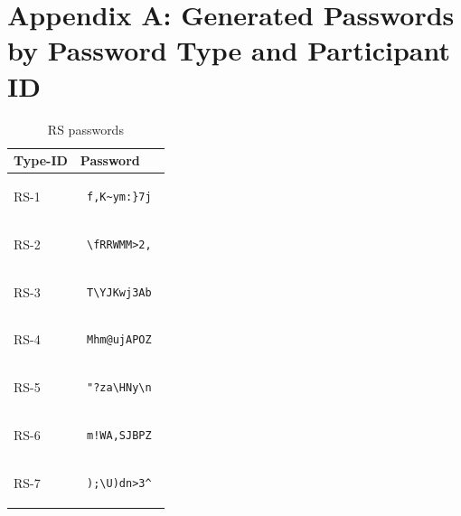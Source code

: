 \documentclass{article}
\begin{document}
\FloatBarrier
\section*{Appendix A: Generated Passwords by Password Type and Participant ID}
\centering
\begin{table}[h]
\begin{tabular}{|m{1.4cm}|m{8cm}|}
\hline
Type-ID & Password \\
\hline
RS-1 & \begin{verbatim} f,K~ym:}7j \end{verbatim} \\
\hline
RS-2 & \begin{verbatim} \fRRWMM>2, \end{verbatim} \\
\hline
RS-3 & \begin{verbatim} T\YJKwj3Ab \end{verbatim} \\
\hline
RS-4 & \begin{verbatim} Mhm@ujAPOZ \end{verbatim} \\
\hline
RS-5 & \begin{verbatim} "?za\HNy\n \end{verbatim} \\
\hline
RS-6 & \begin{verbatim} m!WA,SJBPZ \end{verbatim} \\
\hline
RS-7 & \begin{verbatim} );\U)dn>3^ \end{verbatim} \\
\hline
\end{tabular}
\caption{RS passwords}
\end{table}
\end{document}
